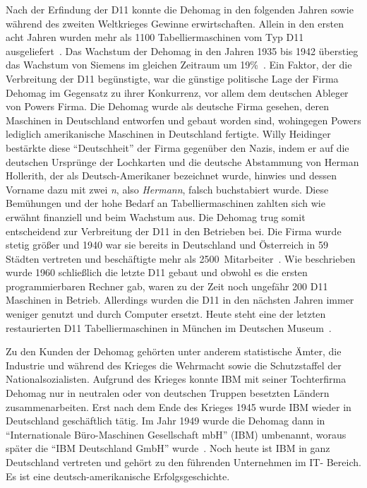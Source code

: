 \documentclass[parskip=half]{scrartcl}
\begin{document}
Nach der Erfindung der D11 konnte die Dehomag in den folgenden Jahren sowie
während des zweiten Weltkrieges Gewinne erwirtschaften. Allein in den ersten
acht Jahren wurden mehr als 1100 Tabelliermaschinen vom Typ D11
ausgeliefert~\cite{Kist95}. Das Wachstum der Dehomag in den Jahren 1935 bis
1942 überstieg das Wachstum von Siemens im gleichen Zeitraum um
19\%~\cite{heide2009punched}. Ein Faktor, der die Verbreitung der D11
begünstigte, war die günstige politische Lage der Firma Dehomag im Gegensatz zu
ihrer Konkurrenz, vor allem dem deutschen Ableger von Powers Firma. Die Dehomag
wurde als deutsche Firma gesehen, deren Maschinen in Deutschland entworfen und
gebaut worden sind, wohingegen Powers lediglich amerikanische Maschinen in
Deutschland fertigte.  Willy Heidinger bestärkte diese \enquote{Deutschheit}
der Firma gegenüber den Nazis, indem er auf die deutschen Ursprünge der
Lochkarten und die deutsche Abstammung von Herman Hollerith, der als
Deutsch-Amerikaner bezeichnet wurde, hinwies und dessen Vorname dazu mit zwei
\emph{n}, also \emph{Hermann}, falsch buchstabiert wurde. Diese Bemühungen und
der hohe Bedarf an Tabelliermaschinen zahlten sich wie erwähnt finanziell und
beim Wachstum aus. Die Dehomag trug somit entscheidend zur Verbreitung der D11
in den Betrieben bei. Die Firma wurde stetig größer und 1940 war sie bereits in
Deutschland und Österreich in 59 Städten vertreten und beschäftigte mehr als
2500~Mitarbeiter~\cite{dingwerth}. Wie beschrieben wurde 1960 schließlich die
letzte D11 gebaut und obwohl es die ersten programmierbaren Rechner gab, waren
zu der Zeit noch ungefähr 200 D11 Maschinen in Betrieb. Allerdings wurden die
D11 in den nächsten Jahren immer weniger genutzt und durch Computer ersetzt.
Heute steht eine der letzten restaurierten D11 Tabelliermaschinen in München im
Deutschen Museum~\cite{Kist95}.

Zu den Kunden der Dehomag gehörten unter anderem statistische Ämter, die
Industrie und während des Krieges die Wehrmacht sowie die Schutzstaffel der
Nationalsozialisten. Aufgrund des Krieges konnte IBM mit seiner Tochterfirma
Dehomag nur in neutralen oder von deutschen Truppen besetzten Ländern
zusammenarbeiten. Erst nach dem Ende des Krieges 1945 wurde IBM wieder in
Deutschland geschäftlich tätig. Im Jahr 1949 wurde die Dehomag dann in
\enquote{Internationale Büro-Maschinen Gesellschaft mbH} (IBM) umbenannt,
woraus später die \enquote{IBM Deutschland GmbH} wurde~\cite{sendler}.
Noch heute ist IBM in ganz Deutschland vertreten und gehört zu den führenden
Unternehmen im IT- Bereich. Es ist eine deutsch-amerikanische
Erfolgsgeschichte.
\end{document}

